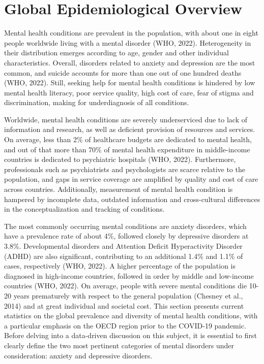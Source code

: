 \section{Global Epidemiological Overview}
    Mental health conditions are prevalent in the population, with about one in eight people worldwide living with a mental disorder (WHO, 2022). Heterogeneity in their distribution emerges according to age, gender and other individual characteristics. Overall, disorders related to anxiety and depression are the most common, and suicide accounts for more than one out of one hundred deaths (WHO, 2022). 
    Still, seeking help for mental health conditions is hindered by low mental health literacy, poor service quality, high cost of care, fear of stigma and discrimination, making for underdiagnosis of all conditions. 

    Worldwide, mental health conditions are severely underserviced due to lack of information and research, as well as deficient provision of resources and services. On average, less than 2\% of healthcare budgets are dedicated to mental health, and out of that more than 70\% of mental health expenditure in middle-income countries is dedicated to psychiatric hospitals (WHO, 2022). 
    Furthermore, professionals such as psychiatrists and psychologists are scarce relative to the population, and gaps in service coverage are amplified by quality and cost of care across countries. 
    Additionally, measurement of mental health condition is hampered by incomplete data, outdated information and cross-cultural differences in the conceptualization and tracking of conditions.

    The most commonly occurring mental conditions are anxiety disorders, which have a prevalence rate of about 4\%, followed closely by depressive disorders at 3.8\%. Developmental disorders and Attention Deficit Hyperactivity Disorder (ADHD) are also significant, contributing to an additional 1.4\% and 1.1\% of cases, respectively (WHO, 2022).
    A higher percentage of the population is diagnosed in high-income countries, followed in order by middle and low-income countries (WHO, 2022). On average, people with severe mental conditions die 10-20 years prematurely with respect to the general population (Chesney et al., 2014) and at great individual and societal cost. 
    This section presents current statistics on the global prevalence and diversity of mental health conditions, with a particular emphasis on the OECD region prior to the COVID-19 pandemic. Before delving into a data-driven discussion on this subject, it is essential to first clearly define the two most pertinent categories of mental disorders under consideration: anxiety and depressive disorders. 


